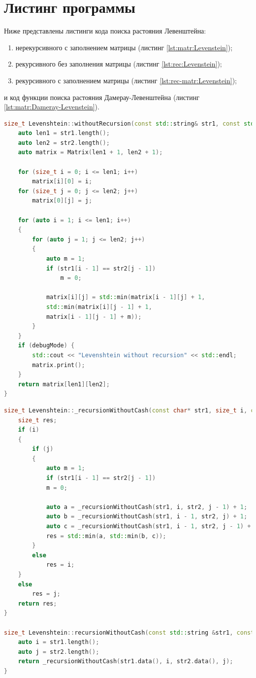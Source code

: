     \section{Листинг программы}
        Ниже представлены листинги кода поиска растояния Левенштейна: \begin{enumerate}
            \item нерекурсивного с заполнением матрицы (листинг \ref{lst:matr:Levenstein});
            \item рекурсивного без заполнения матрицы (листинг \ref{lst:rec:Levenstein});
            \item рекурсивного с заполнением матрицы (листинг \ref{lst:rec-matr:Levenstein});
        \end{enumerate}
        
        и код функции поиска растояния Дамерау-Левенштейна (листинг \ref{lst:matr:Dameray-Levenstein}).

        \begin{lstlisting}[language=C++, label=lst:matr:Levenstein, caption=Функция нерекурсивного поиска с заполнением матрицы]
size_t Levenshtein::withoutRecursion(const std::string& str1, const std::string& str2, bool debugMode) {
    auto len1 = str1.length();
    auto len2 = str2.length();
    auto matrix = Matrix(len1 + 1, len2 + 1);

    for (size_t i = 0; i <= len1; i++)
        matrix[i][0] = i;
    for (size_t j = 0; j <= len2; j++)
        matrix[0][j] = j;

    for (auto i = 1; i <= len1; i++)
    {
        for (auto j = 1; j <= len2; j++)
        {
            auto m = 1;
            if (str1[i - 1] == str2[j - 1])
                m = 0;

            matrix[i][j] = std::min(matrix[i - 1][j] + 1,
            std::min(matrix[i][j - 1] + 1,
            matrix[i - 1][j - 1] + m));
        }
    }
    if (debugMode) {
        std::cout << "Levenshtein without recursion" << std::endl;
        matrix.print();
    }
    return matrix[len1][len2];
}
        \end{lstlisting}

        \begin{lstlisting}[language=C++, label=lst:rec:Levenstein, caption=Функция рекурсивного поиска без заполнения матрицы]
size_t Levenshtein::_recursionWithoutCash(const char* str1, size_t i, const char* str2, size_t j) {
    size_t res;
    if (i)
    {
        if (j)
        {
            auto m = 1;
            if (str1[i - 1] == str2[j - 1])
            m = 0;

            auto a = _recursionWithoutCash(str1, i, str2, j - 1) + 1;
            auto b = _recursionWithoutCash(str1, i - 1, str2, j) + 1;
            auto c = _recursionWithoutCash(str1, i - 1, str2, j - 1) + m;
            res = std::min(a, std::min(b, c));
        }
        else
            res = i;
    }
    else
        res = j;
    return res;
}

size_t Levenshtein::recursionWithoutCash(const std::string &str1, const std::string &str2) {
    auto i = str1.length();
    auto j = str2.length();
    return _recursionWithoutCash(str1.data(), i, str2.data(), j);
}
        \end{lstlisting}

